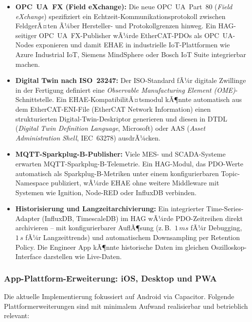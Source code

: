 ﻿\documentclass[12pt,a4paper]{article}
\begin{document}
\begin{itemize}[leftmargin=2em]
  \item \textbf{OPC~UA~FX (Field eXchange):} Die neue OPC~UA~Part~80
    (\emph{Field eXchange}) spezifiziert ein Echtzeit-Kommunikationsprotokoll
    zwischen FeldgerÃ¤ten Ã¼ber Hersteller- und Protokollgrenzen hinweg. Ein
    HAG-seitiger OPC~UA~FX-Publisher wÃ¼rde Ether\-CAT-PDOs als
    OPC~UA-Nodes exponieren und damit EHAE in industrielle IoT-Plattformen
    wie Azure Industrial IoT, Siemens MindSphere oder Bosch IoT Suite
    integrierbar machen.
  \item \textbf{Digital Twin nach ISO~23247:} Der ISO-Standard fÃ¼r digitale
    Zwillinge in der Fertigung definiert eine \emph{Observable Manufacturing
    Element (OME)}-Schnittstelle. Ein EHAE-KompatibilitÃ¤tsmodul kÃ¶nnte
    automatisch aus dem EtherCAT-ENI-File (EtherCAT Network Information) einen
    strukturierten Digital-Twin-Deskriptor generieren und diesen in
    DTDL (\emph{Digital Twin Definition Language}, Microsoft) oder
    AAS (\emph{Asset Administration Shell}, IEC~63278) ausdrÃ¼cken.
  \item \textbf{MQTT-Sparkplug-B-Publisher:} Viele MES- und SCADA-Systeme
    erwarten MQTT-Sparkplug-B-Telemetrie. Ein HAG-Modul, das PDO-Werte
    automatisch als Sparkplug-B-Metriken unter einem konfigurierbaren
    Topic-Namespace publiziert, wÃ¼rde EHAE ohne weitere Middleware mit
    Systemen wie Ignition, Node-RED oder InfluxDB verbinden.
  \item \textbf{Historisierung und Langzeitarchivierung:} Ein integrierter
    Time-Series-Adapter (InfluxDB, TimescaleDB) im HAG wÃ¼rde PDO-Zeitreihen
    direkt archivieren -- mit konfigurierbarer AuflÃ¶sung (z.\,B.\ $1\,\si{ms}$
    fÃ¼r Debugging, $1\,\si{s}$ fÃ¼r Langzeittrends) und automatischem Downsampling
    per Retention Policy. Die Engineer App kÃ¶nnte historische Daten im gleichen
    Oszilloskop-Interface darstellen wie Live-Daten.
\end{itemize}

\subsubsection*{App-Plattform-Erweiterung: iOS, Desktop und PWA}

Die aktuelle Implementierung fokussiert auf Android via Capacitor. Folgende
Plattformerweiterungen sind mit minimalem Aufwand realisierbar und betrieblich
relevant:
\end{document}
